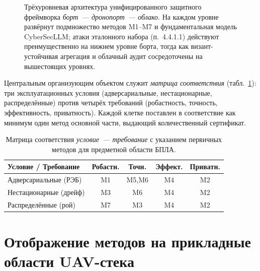 \begin{figure}[t]
\caption[Трёхуровневая архитектура защитного фреймворка.]%
{Трёхуровневая архитектура унифицированного защитного фреймворка
\emph{борт~--- дронопорт~--- облако}. На каждом уровне развёрнут
подмножество методов \textsf{M1}--\textsf{M7} и фундаментальная
модель \textsf{CyberSecLLM}; атаки эталонного набора (п.~4.4.1.1)
действуют преимущественно на нижнем уровне борта, тогда как
визант-устойчивая агрегация и облачный аудит сосредоточены на
вышестоящих уровнях.}
\label{fig:uav_arch}
\end{figure}

Центральным организующим объектом служит \emph{матрица соответствия}
(табл.~\ref{tab:uav_matrix}): три эксплуатационных условия
(адверсариальные, нестационарные, распределённые) против четырёх
требований (робастность, точность, эффективность, приватность). Каждой
клетке поставлен в соответствие как минимум один метод
основной части, выдающий количественный сертификат.

\begin{table}[t]
\centering
\caption{Матрица соответствия \emph{условие~--- требование} с
указанием первичных методов для предметной области БПЛА.}
\label{tab:uav_matrix}
\small
\setlength{\tabcolsep}{6pt}
\renewcommand{\arraystretch}{1.2}
\begin{tabular}{l|c|c|c|c}
\toprule
\textbf{Условие / Требование} & \textbf{Робастн.} & \textbf{Точн.}
& \textbf{Эффект.} & \textbf{Приватн.}\\
\midrule
Адверсариальные (РЭБ)      & \textsf{M1} & \textsf{M5,M6} & \textsf{M4} & \textsf{M2}\\
Нестационарные (дрейф)     & \textsf{M3} & \textsf{M6}    & \textsf{M4} & \textsf{M2}\\
Распределённые (рой)       & \textsf{M7} & \textsf{M3}    & \textsf{M4} & \textsf{M2}\\
\bottomrule
\end{tabular}
\end{table}

\section{Отображение методов на прикладные области UAV-стека}
\label{sec:uav_mapping}


